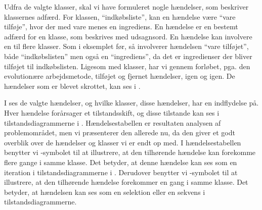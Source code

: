Udfra de valgte klasser, skal vi have formuleret nogle hændelser, som beskriver klassernes adfærd. For klassen, ``indkøbsliste'', kan en hændelse \fx være ``vare tilføje'', hvor der med vare menes en ingrediens. En hændelse er en bestemt adfærd for en klasse, som beskrives med udsagnsord. En hændelse kan involvere en til flere klasser. Som i eksemplet før, så involverer hændelsen ``vare tilføjet'', både ``indkøbslisten'' men også en ``ingrediens'', da det er ingredienser der bliver tilføjet til indkøbslisten. Ligesom med klasser, har vi gennem forløbet, pga. den evolutionære arbejdsmetode, tilføjet og fjernet hændelser, igen og igen. De hændelser som er blevet skrottet, kan ses i .    

I  ses de valgte hændelser, og hvilke klasser, disse hændelser, har en indflydelse på. Hver hændelse forårsager et tilstandsskift, og disse tilstande kan ses i tilstandsdiagrammerne i . Hændelsestabellen er resultaten analysen af problemområdet, men vi præsenterer den allerede nu, da den giver et godt overblik over de hændelser og klasser vi er endt op med. I hændelsestabellen benytter vi \iter-symbolet til at illustrere, at den tilhørende hændelse kan forekomme flere gange i samme klasse. Det betyder, at denne hændelse kan ses som en iteration i tilstandsdiagrammerne i . Derudover benytter vi \once-symbolet til at illustrere, at den tilhørende hændelse forekommer en gang i samme klasse. Det betyder, at hændelsen kan ses som en selektion eller en sekvens i tilstandsdiagrammerne.


